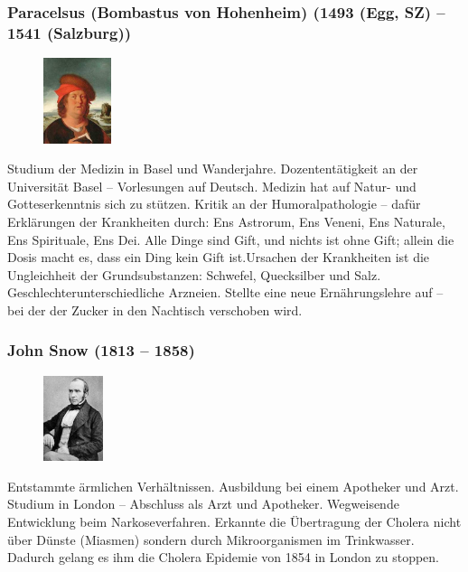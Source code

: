 \documentclass[10pt, openright=true]{scrartcl}
\begin{document}
\subsubsection{Paracelsus (Bombastus von Hohenheim) (1493 (Egg, SZ) – 1541 (Salzburg))}
\begin{figure} 
\vspace{-0.5cm}
  \includegraphics[height=2.5cm]{images/paracelsus}
\end{figure}
Studium der Medizin in Basel und Wanderjahre. Dozententätigkeit an der Universität Basel – Vorlesungen auf Deutsch. Medizin hat auf Natur- und Gotteserkenntnis sich zu stützen. Kritik an der Humoralpathologie – dafür Erklärungen der Krankheiten durch: Ens Astrorum, Ens Veneni, Ens Naturale, Ens Spirituale, Ens Dei. \glqq Alle Dinge sind Gift, und nichts ist ohne Gift; allein die Dosis macht es, dass ein Ding kein Gift ist\grqq .Ursachen der Krankheiten ist die Ungleichheit der Grundsubstanzen: Schwefel, Quecksilber und Salz. Geschlechterunterschiedliche Arzneien. Stellte eine neue Ernährungslehre auf – bei der der Zucker in den Nachtisch verschoben wird. 
\subsubsection{John Snow (1813 – 1858)}
\begin{figure} 
\vspace{-0.5cm}
  \includegraphics[height=2.5cm]{images/snow}
\end{figure}
Entstammte ärmlichen Verhältnissen. Ausbildung bei einem Apotheker und Arzt. Studium in London – Abschluss als Arzt und Apotheker. Wegweisende Entwicklung beim Narkoseverfahren. Erkannte die Übertragung der Cholera nicht über Dünste (Miasmen) sondern durch Mikroorganismen im Trinkwasser. Dadurch gelang es ihm die Cholera Epidemie von 1854 in London zu stoppen. 
\end{document}
